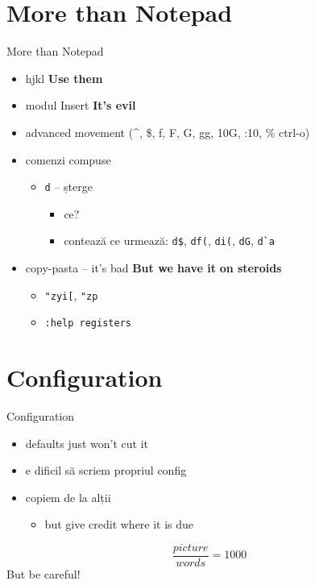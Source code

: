 \documentclass{beamer}
\begin{document}
\section{More than Notepad}
\begin{frame}{More than Notepad}
  \begin{itemize}
    \item hjkl \pause \hspace{1cm} \textbf{Use them}
    \pause
    \item modul Insert \pause \hspace{1cm} \textbf{It's evil}
    \pause
    \item advanced movement (\^{}, \$, f, F, G, gg, 10G, :10, \% ctrl-o)
    \pause
    \item comenzi compuse
    \pause
    \begin{itemize}
      \item \texttt{d} -- șterge
      \begin{itemize}
        \item ce?
        \pause
        \item contează ce urmează: \texttt{d\$}, \texttt{df(}, \texttt{di(},
          \texttt{dG}, \texttt{d\`{}a}
      \end{itemize}
    \end{itemize}
    \pause
    \item copy-pasta -- it's bad \pause \hspace{1cm} \textbf{But we have it}
    \pause \textbf{on steroids}
    \begin{itemize}
      \pause
      \item \texttt{"zyi[}, \texttt{"zp}
      \item \texttt{:help registers}
    \end{itemize}
  \end{itemize}
\end{frame}

\section{Configuration}
\begin{frame}{Configuration}
  \begin{itemize}
    \item defaults just won't cut it
    \item e dificil să scriem propriul config
    \item copiem de la alții
    \pause
    \begin{itemize}
      \item but give credit where it is due
    \end{itemize}
  \end{itemize}
  \pause
  $$ \frac{picture}{words} = 1000 $$
  \pause
But be careful!
\end{frame}
\end{document}
